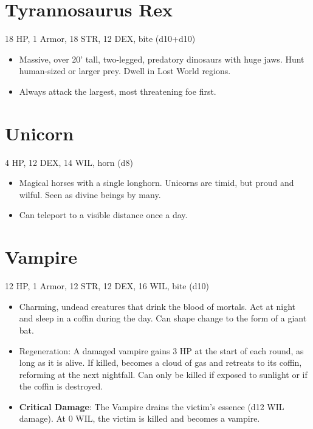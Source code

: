 \documentclass[
  10pt,
  american,
]{article}
\begin{document}
\hypertarget{tyrannosaurus-rex}{%
\section{Tyrannosaurus Rex}\label{tyrannosaurus-rex}}

18 HP, 1 Armor, 18 STR, 12 DEX, bite (d10+d10)

\begin{samepage}
\begin{itemize}
\setlength\itemsep{-.5em}
\item Massive, over 20’ tall, two-legged, predatory dinosaurs with huge jaws. Hunt human-sized or larger prey. Dwell in Lost World regions.
\item Always attack the largest, most threatening foe first.
\end{itemize}
\end{samepage}

\hypertarget{unicorn}{%
\section{Unicorn}\label{unicorn}}

4 HP, 12 DEX, 14 WIL, horn (d8)

\begin{samepage}
\begin{itemize}
\setlength\itemsep{-.5em}
\item Magical horses with a single longhorn. Unicorns are timid, but proud and wilful. Seen as divine beings by many.
\item Can teleport to a visible distance once a day.
\end{itemize}
\end{samepage}

\hypertarget{vampire}{%
\section{Vampire}\label{vampire}}

12 HP, 1 Armor, 12 STR, 12 DEX, 16 WIL, bite (d10)

\begin{samepage}
\begin{itemize}
\setlength\itemsep{-.5em}
\item Charming, undead creatures that drink the blood of mortals. Act at night and sleep in a coffin during the day. Can shape change to the form of a giant bat.
\item Regeneration: A damaged vampire gains 3 HP at the start of each round, as long as it is alive. If killed, becomes a cloud of gas and retreats to its coffin, reforming at the next nightfall. Can only be killed if exposed to sunlight or if the coffin is destroyed.
\item \textbf{Critical Damage}: The Vampire drains the victim's essence (d12 WIL damage). At 0 WIL, the victim is killed and becomes a vampire.
\end{itemize}
\end{samepage}
\end{document}
